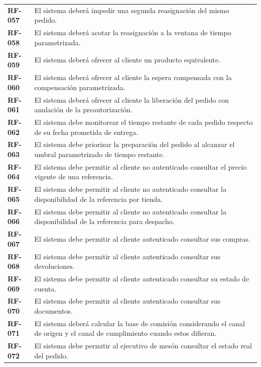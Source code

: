 \documentclass[11pt]{article}
\begin{document}
\begin{longtable}[]{@{}
  >{\raggedright\arraybackslash}p{}
  >{\raggedright\arraybackslash}p{}@{}}
\addlinespace[2pt]
\textbf{RF-057} & El sistema deberá impedir una segunda reasignación del mismo pedido. \\
\addlinespace[2pt]
\textbf{RF-058} & El sistema deberá acotar la reasignación a la ventana de tiempo parametrizada. \\
\addlinespace[2pt]
\textbf{RF-059} & El sistema deberá ofrecer al cliente un producto equivalente. \\
\addlinespace[2pt]
\textbf{RF-060} & El sistema deberá ofrecer al cliente la espera compensada con la compensación parametrizada. \\
\addlinespace[2pt]
\textbf{RF-061} & El sistema deberá ofrecer al cliente la liberación del pedido con anulación de la preautorización. \\
\addlinespace[2pt]
\textbf{RF-062} & El sistema debe monitorear el tiempo restante de cada pedido respecto de su fecha prometida de entrega. \\
\addlinespace[2pt]
\textbf{RF-063} & El sistema debe priorizar la preparación del pedido al alcanzar el umbral parametrizado de tiempo restante. \\
\addlinespace[2pt]
\textbf{RF-064} & El sistema debe permitir al cliente no autenticado consultar el precio vigente de una referencia. \\
\addlinespace[2pt]
\textbf{RF-065} & El sistema debe permitir al cliente no autenticado consultar la disponibilidad de la referencia por tienda. \\
\addlinespace[2pt]
\textbf{RF-066} & El sistema debe permitir al cliente no autenticado consultar la disponibilidad de la referencia para despacho. \\
\addlinespace[2pt]
\textbf{RF-067} & El sistema debe permitir al cliente autenticado consultar sus compras. \\
\addlinespace[2pt]
\textbf{RF-068} & El sistema debe permitir al cliente autenticado consultar sus devoluciones. \\
\addlinespace[2pt]
\textbf{RF-069} & El sistema debe permitir al cliente autenticado consultar su estado de cuenta. \\
\addlinespace[2pt]
\textbf{RF-070} & El sistema debe permitir al cliente autenticado consultar sus documentos. \\
\addlinespace[2pt]
\textbf{RF-071} & El sistema deberá calcular la base de comisión considerando el canal de origen y el canal de cumplimiento cuando estos difieran. \\
\addlinespace[2pt]
\textbf{RF-072} & El sistema debe permitir al ejecutivo de mesón consultar el estado real del pedido. \\

\end{longtable}
\end{document}
